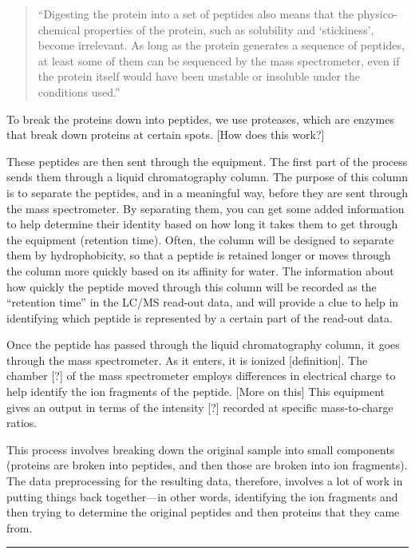 \documentclass[
]{book}
\begin{document}
\begin{quote}
``Digesting the protein into a set of peptides also means that the
physico-chemical properties of the protein, such as solubility and `stickiness',
become irrelevant. As long as the protein generates a sequence of peptides, at
least some of them can be sequenced by the mass spectrometer, even if the
protein itself would have been unstable or insoluble under the conditions used.''
\citep{steen2004abc}
\end{quote}

To break the proteins down into peptides, we use proteases, which are enzymes
that break down proteins at certain spots. {[}How does this work?{]}

These peptides are then sent through the equipment. The first part of the
process sends them through a liquid chromatography column. The purpose of
this column is to separate the peptides, and in a meaningful way, before
they are sent through the mass spectrometer. By separating them, you
can get some added information to help determine their identity based on
how long it takes them to get through the equipment (retention time).
Often, the column will be designed to separate them by hydrophobicity,
so that a peptide is retained longer or moves through the column more
quickly based on its affinity for water. The information about how
quickly the peptide moved through this column will be recorded as the
``retention time'' in the LC/MS read-out data, and will provide a clue to
help in identifying which peptide is represented by a certain part of the
read-out data.

Once the peptide has passed through the liquid chromatography column,
it goes through the mass spectrometer. As it enters, it is ionized
{[}definition{]}. The chamber {[}?{]} of the mass spectrometer employs
differences in electrical charge to help identify the ion fragments
of the peptide. {[}More on this{]} This equipment gives an output in terms
of the intensity {[}?{]} recorded at specific mass-to-charge ratios.

This process involves breaking down the original sample into small
components (proteins are broken into peptides, and then those are
broken into ion fragments). The data preprocessing for the resulting
data, therefore, involves a lot of work in putting things back
together---in other words, identifying the ion fragments and then
trying to determine the original peptides and then proteins that
they came from.

\begin{center}\rule{0.5\linewidth}{0.5pt}\end{center}
\end{document}
